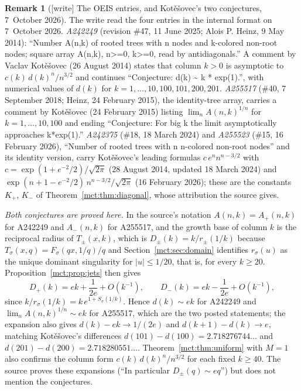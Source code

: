 \documentclass[11pt]{article}
\theoremstyle{definition}
\newtheorem{remark}[theorem]{Remark}
\begin{document}
\begin{remark}[{[write]} The OEIS entries, and Kot\v{e}\v{s}ovec's two conjectures, 7~October 2026]\label{mct:rem:oeis}
The write read the four entries in the internal format on 7~October 2026.
\emph{A242249} (revision \#47, 11 June 2025; Alois P. Heinz, 9 May 2014): ``Number A(n,k) of rooted trees with n nodes and k-colored non-root nodes; square array A(n,k), n>=0, k>=0, read by antidiagonals.'' A comment by Vaclav Kot\v{e}\v{s}ovec (26 August 2014) states that column $k>0$ is asymptotic to $c(k)\,d(k)^n/n^{3/2}$ and continues ``Conjecture: d(k) \textasciitilde{} k * exp(1).'', with numerical values of $d(k)$ for $k=1,\ldots,10,100,101,200,201$.
\emph{A255517} (\#40, 7 September 2018; Heinz, 24 February 2015), the identity-tree array, carries a comment by Kot\v{e}\v{s}ovec (24 February 2015) listing $\lim_n A(n,k)^{1/n}$ for $k=1,\ldots,10,100$ and ending ``Conjecture: For big k the limit asymptotically approaches k*exp(1).''
\emph{A242375} (\#18, 18 March 2024) and \emph{A255523} (\#15, 16 February 2026), ``Number of rooted trees with n n-colored non-root nodes'' and its identity version, carry Kot\v{e}\v{s}ovec's leading formulas $c\,e^nn^{n-3/2}$ with $c=\exp(1+e^{-2}/2)/\sqrt{2\pi}$ (28 August 2014, updated 18 March 2024) and $\exp(n+1-e^{-2}/2)\,n^{n-3/2}/\sqrt{2\pi}$ (16 February 2026); these are the constants $K_+$, $K_-$ of Theorem~\ref{mct:thm:diagonal}, whose attribution the source gives.

\emph{Both conjectures are proved here.} In the source's notation $A(n,k)=A_+(n,k)$ for A242249 and $A_-(n,k)$ for A255517, and the growth base of column $k$ is the reciprocal radius of $T_\pm(x,k)$, which is $D_\pm(k)=k/r_\pm(1/k)$ because $T_\sigma(x,q)=F_\sigma(qx,1/q)/q$ and Section~\ref{mct:sec:domain} identifies $r_\sigma(u)$ as the unique dominant singularity for $|u|\le1/20$, that is, for every $k\ge20$. Proposition~\ref{mct:prop:jets} then gives
\[
 D_+(k)=ek+\frac1{2e}+O(k^{-1}),\qquad D_-(k)=ek-\frac1{2e}+O(k^{-1}),
\]
since $k/r_\sigma(1/k)=k\,e^{1+S_\sigma(1/k)}$. Hence $d(k)\sim ek$ for A242249 and $\lim_nA(n,k)^{1/n}\sim ek$ for A255517, which are the two posted statements; the expansion also gives $d(k)-ek\to1/(2e)$ and $d(k+1)-d(k)\to e$, matching Kot\v{e}\v{s}ovec's differences $d(101)-d(100)=2.718276744\ldots$ and $d(201)-d(200)=2.718280551\ldots$. Theorem~\ref{mct:thm:uniform} with $M=1$ also confirms the column form $c(k)\,d(k)^n/n^{3/2}$ for each fixed $k\ge40$. The source proves these expansions (``In particular $D_\pm(q)\sim eq$'') but does not mention the conjectures.


\end{remark}
\end{document}

